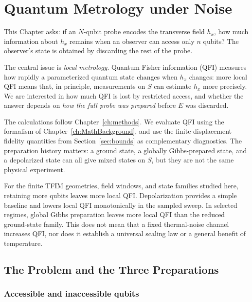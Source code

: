 \chapter{Quantum Metrology under Noise}
\label{ch:noise_analysis}

This Chapter asks: if an $N$-qubit probe encodes the transverse field $h_x$, how much information about $h_x$ remains when an observer can access only $n$ qubits?  The observer's state is obtained by discarding the rest of the probe.

The central issue is \emph{local metrology}.  Quantum Fisher information (QFI) measures how rapidly a parameterized quantum state changes when $h_x$ changes: more local QFI means that, in principle, measurements on $S$ can estimate $h_x$ more precisely.  We are interested in how much QFI is lost by restricted access, and whether the answer depends on \emph{how the full probe was prepared} before $E$ was discarded.

The calculations follow Chapter~\ref{ch:methods}.  We evaluate QFI using the formalism of Chapter~\ref{ch:MathBackground}, and use the finite-displacement fidelity quantities from Section~\ref{sec:bounds} as complementary diagnostics.  The preparation history matters: a ground state, a globally Gibbs-prepared state, and a depolarized state can all give mixed states on $S$, but they are not the same physical experiment.

\begin{remark}
    For the finite TFIM geometries, field windows, and state families studied here, retaining more qubits leaves more local QFI.  Depolarization provides a simple baseline and lowers local QFI monotonically in the sampled sweep.  In selected regimes, global Gibbs preparation leaves more local QFI than the reduced ground-state family.  This does not mean that a fixed thermal-noise channel increases QFI, nor does it establish a universal scaling law or a general benefit of temperature.
\end{remark}
\section{The Problem and the Three Preparations}
\label{sec:noise_state_families}
\subsection{Accessible and inaccessible qubits}

